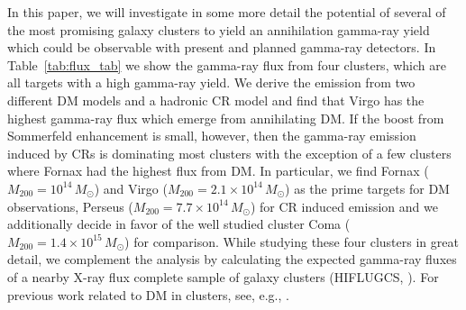 \documentclass[10pt,aps,pra,reprint,amsmath,amsfonts,amssymb,showpacs,nofootinbib,floatfix]{revtex4-1}
\def\del#1{{}}
\newcommand{\msun}{M_\odot}
\newcommand{\mvir}{M_{200}}
\begin{document}
In this paper, we will investigate in some more detail the potential
of several of the most promising galaxy clusters to yield an
annihilation gamma-ray yield which could be observable with present
and planned gamma-ray detectors. In Table~\ref{tab:flux_tab} we show
the gamma-ray flux from four clusters, which are all targets with a
high gamma-ray yield. We derive the emission from two different DM
models and a hadronic CR model and find that Virgo has the highest
gamma-ray flux which emerge from annihilating DM. If the boost from
Sommerfeld enhancement is small, however, then the gamma-ray emission
induced by CRs is dominating most clusters with the exception of a few
clusters where Fornax had the highest flux from DM. In particular, we
find Fornax ($\mvir=10^{14}\,\msun$) and Virgo
($\mvir=2.1\times10^{14}\,\msun$) \del{\cite{}} as the prime targets
for DM observations, Perseus ($\mvir=7.7\times10^{14}\,\msun$) for CR
induced emission and we additionally decide in favor of the well
studied cluster Coma ($\mvir=1.4\times10^{15}\,\msun$) for
comparison. While studying these four clusters in great detail, we
complement the analysis by calculating the expected gamma-ray fluxes
of a nearby X-ray flux complete sample of galaxy clusters (HIFLUGCS,
\citealt{2002ApJ...567..716R}). For previous work related to DM in
clusters, see, e.g., \cite{2006A&A...455...21C,2009PhRvD..80b3005J}.
\end{document}

